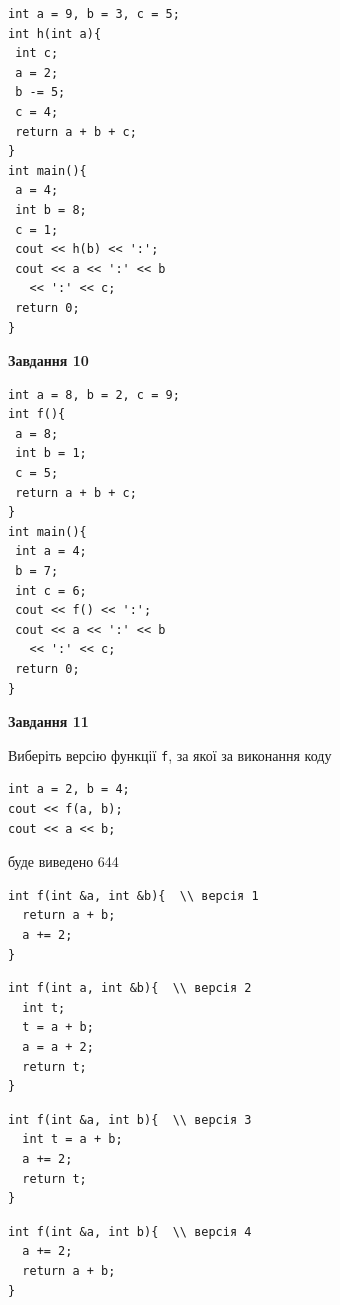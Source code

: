 \documentclass[12pt, ukrainian]{article}
\def\code#1{\Verb!#1!}
\begin{document}
{\begin {large}
\begin{minipage}[t]{7.0cm}
\begin{verbatim}
int a = 9, b = 3, c = 5;
int h(int a){
 int c;
 a = 2;
 b -= 5;
 c = 4;
 return a + b + c;
}
int main(){
 a = 4;
 int b = 8;
 c = 1;
 cout << h(b) << ':';
 cout << a << ':' << b 
   << ':' << c;
 return 0;
}
\end{verbatim}



\begin{center}
\textbf{Завдання 10}
\end{center}
\vspace{-8mm}

\begin{verbatim}
int a = 8, b = 2, c = 9;
int f(){
 a = 8;
 int b = 1;
 c = 5;
 return a + b + c;
}
int main(){
 int a = 4;
 b = 7;
 int c = 6;
 cout << f() << ':';
 cout << a << ':' << b 
   << ':' << c;
 return 0;
}
\end{verbatim}

\end{minipage}
\vline \hspace{1mm}
\begin{minipage}[t]{11.0cm}

\begin{center}
\textbf{Завдання 11}
\end{center}
Виберіть версію функції \code{f}, за якої за виконання коду
\begin{verbatim}
int a = 2, b = 4;
cout << f(a, b);
cout << a << b;
\end{verbatim}

буде виведено 644

\begin{verbatim}
int f(int &a, int &b){  \\ версія 1
  return a + b;
  a += 2;
}
\end{verbatim}

\vspace{-8mm}\begin{verbatim}
int f(int a, int &b){  \\ версія 2
  int t;
  t = a + b;
  a = a + 2;
  return t;
}
\end{verbatim}

\vspace{-8mm}\begin{verbatim}
int f(int &a, int b){  \\ версія 3
  int t = a + b;
  a += 2;
  return t;
}
\end{verbatim}

\vspace{-8mm}\begin{verbatim}
int f(int &a, int b){  \\ версія 4
  a += 2;
  return a + b;
}
\end{verbatim}




\end{minipage}
\end{large}}
\end{document}
